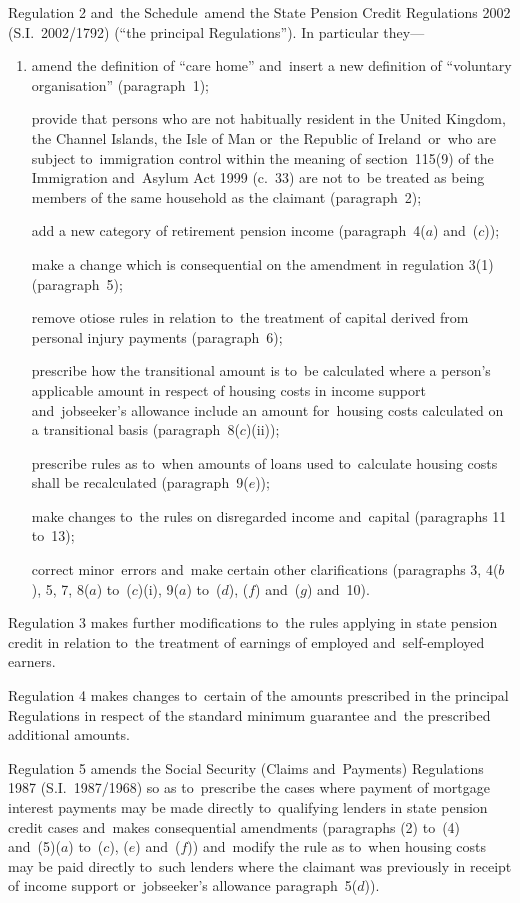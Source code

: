 \documentclass[12pt,a4paper]{article}
\begin{document}
Regulation 2 and~the Schedule~amend the State Pension Credit Regulations 2002 (S.I.~2002/1792) (“the principal Regulations”). In particular they—
\begin{enumerate}\item[]
    amend the definition of “care home” and~insert a new definition of “voluntary organisation” (paragraph~1);

    provide that persons who are not habitually resident in the United Kingdom, the Channel Islands, the Isle of Man or~the Republic of Ireland~or~who are subject to~immigration control within the meaning of section~115(9) of the Immigration and~Asylum Act 1999 (c.~33) are not to~be treated as being members of the same household as the claimant (paragraph~2);

    add a new category of retirement pension income (paragraph~4($a$)  and~($c$));

    make a change which is consequential on the amendment in regulation 3(1) (paragraph~5);

    remove otiose rules in relation to~the treatment of capital derived from personal injury payments (paragraph~6);

    prescribe how the transitional amount is to~be calculated where a person’s applicable amount in respect of housing costs in income support and~jobseeker’s allowance include an amount for~housing costs calculated on a transitional basis (paragraph~8($c$)(ii));

    prescribe rules as to~when amounts of loans used to~calculate housing costs shall be recalculated (paragraph~9($e$));

    make changes to~the rules on disregarded income and~capital (paragraphs 11 to~13);

    correct minor~errors and~make certain other clarifications (paragraphs 3, 4($b$), 5, 7, 8($a$)  to~($c$)(i), 9($a$)  to~($d$), ($f$)  and~($g$)  and~10). 
\end{enumerate}

Regulation 3 makes further modifications to~the rules applying in state pension credit in relation to~the treatment of earnings of employed and~self-employed earners.

Regulation 4 makes changes to~certain of the amounts prescribed in the principal Regulations in respect of the standard minimum guarantee and~the prescribed additional amounts.

Regulation 5 amends the Social Security (Claims and~Payments) Regulations 1987 (S.I.~1987/1968) so as to~prescribe the cases where payment of mortgage interest payments may be made directly to~qualifying lenders in state pension credit cases and~makes consequential amendments (paragraphs (2) to~(4) and~(5)($a$)  to~($c$), ($e$)  and~($f$)) and~modify the rule as to~when housing costs may be paid directly to~such lenders where the claimant was previously in receipt of income support or~jobseeker’s allowance paragraph~5($d$)).
\end{document}
